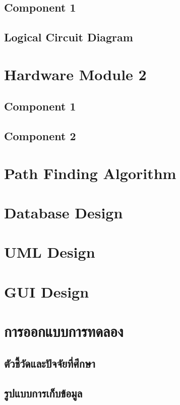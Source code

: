 \documentclass[12pt,oneside,openright,a4paper]{cpe-thai-project}
\begin{document}
\subsection{Component 1}
\subsection{Logical Circuit Diagram}

\section{Hardware Module 2}
\subsection{Component 1}
\subsection{Component 2}

\section{Path Finding Algorithm}

\section{Database Design}

\section{UML Design}

\section{GUI Design}

\section{การออกแบบการทดลอง}
\subsection{ตัวชี้วัดและปัจจัยที่ศึกษา}
\subsection{รูปแบบการเก็บข้อมูล}




\end{document}
